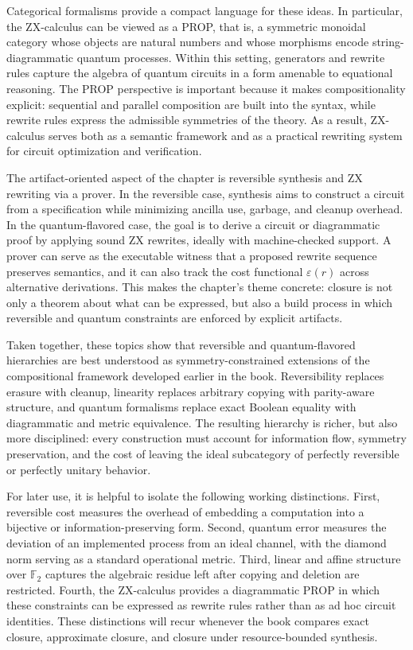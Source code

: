 \documentclass[11pt]{article}
\begin{document}
Categorical formalisms provide a compact language for these ideas. In particular, the ZX-calculus can be viewed as a PROP, that is, a symmetric monoidal category whose objects are natural numbers and whose morphisms encode string-diagrammatic quantum processes. Within this setting, generators and rewrite rules capture the algebra of quantum circuits in a form amenable to equational reasoning. The PROP perspective is important because it makes compositionality explicit: sequential and parallel composition are built into the syntax, while rewrite rules express the admissible symmetries of the theory. As a result, ZX-calculus serves both as a semantic framework and as a practical rewriting system for circuit optimization and verification.

The artifact-oriented aspect of the chapter is reversible synthesis and ZX rewriting via a prover. In the reversible case, synthesis aims to construct a circuit from a specification while minimizing ancilla use, garbage, and cleanup overhead. In the quantum-flavored case, the goal is to derive a circuit or diagrammatic proof by applying sound ZX rewrites, ideally with machine-checked support. A prover can serve as the executable witness that a proposed rewrite sequence preserves semantics, and it can also track the cost functional \(\varepsilon(r)\) across alternative derivations. This makes the chapter’s theme concrete: closure is not only a theorem about what can be expressed, but also a build process in which reversible and quantum constraints are enforced by explicit artifacts.

Taken together, these topics show that reversible and quantum-flavored hierarchies are best understood as symmetry-constrained extensions of the compositional framework developed earlier in the book. Reversibility replaces erasure with cleanup, linearity replaces arbitrary copying with parity-aware structure, and quantum formalisms replace exact Boolean equality with diagrammatic and metric equivalence. The resulting hierarchy is richer, but also more disciplined: every construction must account for information flow, symmetry preservation, and the cost of leaving the ideal subcategory of perfectly reversible or perfectly unitary behavior.

For later use, it is helpful to isolate the following working distinctions. First, reversible cost measures the overhead of embedding a computation into a bijective or information-preserving form. Second, quantum error measures the deviation of an implemented process from an ideal channel, with the diamond norm serving as a standard operational metric. Third, linear and affine structure over \(\mathbb{F}_2\) captures the algebraic residue left after copying and deletion are restricted. Fourth, the ZX-calculus provides a diagrammatic PROP in which these constraints can be expressed as rewrite rules rather than as ad hoc circuit identities. These distinctions will recur whenever the book compares exact closure, approximate closure, and closure under resource-bounded synthesis.
\end{document}
